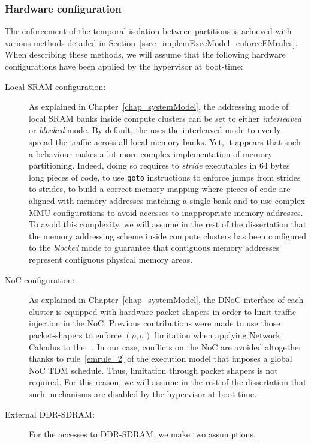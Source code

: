 \documentclass[main.tex]{subfiles}
\begin{document}
\subsubsection{Hardware configuration}
\label{sssec_implemExecModel_assumptions_HwConfig}
The enforcement of the temporal isolation between partitions is achieved with various methods detailed in Section~\ref{ssec_implemExecModel_enforceEMrules}. When describing these methods, we will assume that the following hardware configurations have been applied by the hypervisor at boot-time:
\begin{description}
    \item[Local SRAM configuration: ] 
        As explained in Chapter~\ref{chap_systemModel}, the addressing mode of local SRAM banks inside compute clusters can be set to either \emph{interleaved} or \emph{blocked} mode. By default, the \mppalong uses the interleaved mode to evenly spread the traffic across all local memory banks. Yet, it appears that such a behaviour makes a lot more complex implementation of memory partitioning. Indeed, doing so requires to \emph{stride} executables in 64 bytes long pieces of code, to use \verb#goto# instructions to enforce jumps from strides to strides, to build a correct memory mapping where pieces of code are aligned with memory addresses matching a single bank and to use complex MMU configurations to avoid accesses to inappropriate memory addresses. To avoid this complexity, we will assume in the rest of the dissertation that the memory addressing scheme inside compute clusters has been configured to the \emph{blocked} mode to guarantee that contiguous memory addresses represent contiguous physical memory areas.
    \item[NoC configuration: ]
        As explained in Chapter~\ref{chap_systemModel}, the DNoC interface of each cluster is equipped with hardware packet shapers in order to limit traffic injection in the NoC. Previous contributions were made to use those packet-shapers to enforce $(\rho, \sigma)$ limitation when applying Network Calculus to the \mppalong~\cite{Dinechin2014,Giannopoulou2015}. In our case, conflicts on the NoC are avoided altogether thanks to rule~\ref{emrule_2} of the execution model that imposes a global NoC TDM schedule. Thus, limitation through packet shapers is not required. For this reason, we will assume in the rest of the dissertation that such mechanisms are disabled by the hypervisor at boot time.
    \item[External DDR-SDRAM: ]
        For the accesses to DDR-SDRAM, we make two assumptions.

\end{description}
\end{document}

